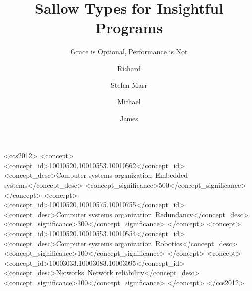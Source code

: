 \documentclass[sigplan, review, 10pt]{acmart}
\begin{document}
\title{Sallow Types for Insightful Programs}
\subtitle{Grace is Optional, Performance is Not}

\author{Richard}
\orcid{}
\affiliation{%
    \department{}
    \institution{}
    \city{}
    \postcode{}
    \country{}
}
\email{}


\author{Stefan Marr}

\author{Michael}
\orcid{}
\affiliation{%
    \department{}
    \institution{}
    \city{}
    \postcode{}
    \country{}
}
\email{}

\author{James}
\orcid{}
\affiliation{%
    \department{}
    \institution{}
    \city{}
    \postcode{}
    \country{}
}
\email{}

\renewcommand{\shortauthors}{R. Roberts et al.}




%
%
\begin{CCSXML}
<ccs2012>
 <concept>
  <concept_id>10010520.10010553.10010562</concept_id>
  <concept_desc>Computer systems organization~Embedded systems</concept_desc>
  <concept_significance>500</concept_significance>
 </concept>
 <concept>
  <concept_id>10010520.10010575.10010755</concept_id>
  <concept_desc>Computer systems organization~Redundancy</concept_desc>
  <concept_significance>300</concept_significance>
 </concept>
 <concept>
  <concept_id>10010520.10010553.10010554</concept_id>
  <concept_desc>Computer systems organization~Robotics</concept_desc>
  <concept_significance>100</concept_significance>
 </concept>
 <concept>
  <concept_id>10003033.10003083.10003095</concept_id>
  <concept_desc>Networks~Network reliability</concept_desc>
  <concept_significance>100</concept_significance>
 </concept>
</ccs2012>
\end{CCSXML}
\end{document}
